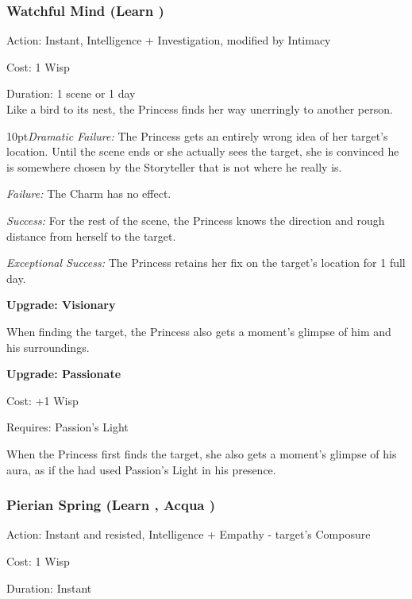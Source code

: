 \subsubsection*{Watchful Mind (Learn \textbullet\textbullet)}

\noindent Action: Instant, Intelligence + Investigation, modified by Intimacy

\noindent Cost: 1 Wisp

\noindent Duration: 1 scene or 1 day \\

Like a bird to its nest, the Princess finds her way unerringly to another person.

\begin{myindentpar}{10pt}\emph{Dramatic Failure:} The Princess gets an entirely wrong idea of her target's location. Until the scene ends or she actually sees the target, she is convinced he is somewhere chosen by the Storyteller that is not where he really is.

    \emph{Failure:} The Charm has no effect.

    \emph{Success:} For the rest of the scene, the Princess knows the direction and rough distance from herself to the target.

    \emph{Exceptional Success:} The Princess retains her fix on the target's location for 1 full day.

\textbf{Upgrade: Visionary}

When finding the target, the Princess also gets a moment's glimpse of him and his surroundings.

\textbf{Upgrade: Passionate}

\noindent Cost: +1 Wisp

Requires: Passion's Light

When the Princess first finds the target, she also gets a moment's glimpse of his aura, as if the had used Passion's Light in his presence. \end{myindentpar}

\subsubsection*{Pierian Spring (Learn \textbullet\textbullet, Acqua \textbullet)}

\noindent Action: Instant and resisted, Intelligence + Empathy - target's Composure

\noindent Cost: 1 Wisp

\noindent Duration: Instant \\

